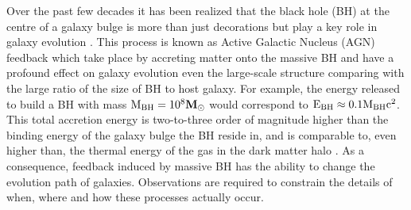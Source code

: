 Over the past few decades it has been realized that the black hole (BH) at the centre of a galaxy bulge is more than just decorations but play a key role in galaxy evolution \citep{fabian4114observational}. 
This process is known as Active Galactic Nucleus (AGN) feedback which take place by accreting matter onto the massive BH and have a profound effect on galaxy evolution even the large-scale structure comparing with the large ratio of the size of BH to host galaxy.
For example, the energy released to build a BH with mass $\rm M_{BH}=10^{8} \mathbf{M}_{\odot}$ would correspond to $\rm E_{BH} \approx 0.1M_{BH}c^{2}$. This total accretion energy is two-to-three order of magnitude higher than the binding energy of the galaxy bulge the BH reside in, and is comparable to, even higher than, the thermal energy of the gas in the dark matter halo \citep{harrison2016observational}. As a consequence, feedback induced by massive BH has the ability to change the evolution path of galaxies. Observations are required to constrain the details of when, where and how these processes actually occur.


